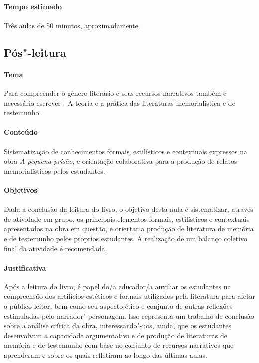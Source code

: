 \documentclass[11pt]{extarticle}
\begin{document}

\paragraph{Tempo estimado} Três aulas de 50 minutos, aproximadamente.


\subsection{Pós"-leitura}

\paragraph{Tema} Para compreender o gênero literário e seus recursos
narrativos também é necessário escrever - A teoria e a prática das
literaturas memorialística e de testemunho.

\paragraph{Conteúdo} Sistematização de conhecimentos formais, estilísticos
e contextuais expressos na obra \emph{A pequena prisão}, e orientação
colaborativa para a produção de relatos memorialísticos pelos
estudantes.

\paragraph{Objetivos} Dada a conclusão da leitura do livro, o objetivo
desta aula é sistematizar, através de atividade em grupo, os principais
elementos formais, estilísticos e contextuais apresentados na obra em
questão, e orientar a produção de literatura de memória e de testemunho
pelos próprios estudantes. A realização de um balanço coletivo final da
atividade é recomendada.

\paragraph{Justificativa} Após a leitura do livro, é papel do/a educador/a
auxiliar os estudantes na compreensão dos artifícios estéticos e formais
utilizados pela literatura para afetar o público leitor, bem como seu
aspecto ético e conjunto de outras reflexões estimuladas pelo
narrador"-personagem. Isso representa um trabalho de conclusão sobre a
análise crítica da obra, interessando"-nos, ainda, que os estudantes
desenvolvam a capacidade argumentativa e de produção de literaturas de
memória e de testemunho com base no conjunto de recursos narrativos que
aprenderam e sobre os quais refletiram ao longo das últimas aulas.
\end{document}
